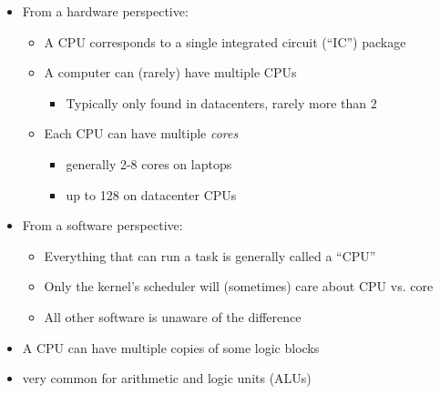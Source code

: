 \documentclass[12pt]{article}
\begin{document}
\begin{itemize}
    \item From a hardware perspective:
    \begin{itemize}
        \item A CPU corresponds to a single integrated circuit (``IC'') package
        \item A computer can (rarely) have multiple CPUs
        \begin{itemize}
            \item Typically only found in datacenters, rarely more than 2
        \end{itemize}
        \item Each CPU can have multiple \textit{cores}
        \begin{itemize}
            \item generally 2-8 cores on laptops
            \item up to 128 on datacenter CPUs
        \end{itemize}
    \end{itemize}
    \item From a software perspective:
    \begin{itemize}
        \item Everything that can run a task is generally called a ``CPU''
        \item Only the kernel's scheduler will (sometimes) care about CPU vs. core
        \item All other software is unaware of the difference
    \end{itemize}

    \item A CPU can have multiple copies of some logic blocks
    \item very common for arithmetic and logic units (ALUs)
\end{itemize}
\end{document}
